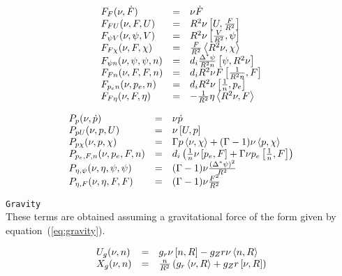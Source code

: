 \begin{equation}
  \begin{array}{lcl}
    F_F (\nu, \dot{F}) & = & \nu \dot{F}\\
    F_{F U}(\nu, F, U) & = & R^2 \nu \left[U,\frac{F}{R^2}\right]\\
    F_{\psi V}(\nu, \psi, V) & = & R^2 \nu \left[\frac{V}{R^2},\psi\right]\\
    F_{F \chi}(\nu, F, \chi) & = & \frac{F}{R^2} \left\langle R^2 \nu,\chi\right\rangle\\
    F_{\psi n}(\nu, \psi, \psi, n) & = &
       d_i \frac{\Delta^* \psi}{R^2 n}\left[\psi,R^2\nu\right]\\
    F_{F n}(\nu, F, F, n) & = &
       d_i R^2 \nu F \left[\frac{1}{R^2 n},F\right]\\
    F_{p_e n}(\nu, p_e, n) & = & d_i R^2 \nu \left[\frac{1}{n},p_e\right]\\
    F_{F \eta}(\nu, F, \eta) & = & -\frac{1}{R^2} \eta \left\langle R^2 \nu,F\right\rangle
  \end{array}
\end{equation}

\begin{equation}
  \begin{array}{lcl}
  P_p(\nu, \dot{p}) & = & \nu \dot{p}
  \\
  P_{p U}(\nu, p, U) & = & \nu \left[U,p\right]
  \\
  P_{p \chi}(\nu, p, \chi) & = & \Gamma p \left\langle \nu,\chi\right\rangle 
    + (\Gamma - 1) \nu \left\langle p,\chi\right\rangle
  \\
  P_{p_e, F, n}(\nu, p_e, F, n) & = & d_i \left( 
      \frac{1}{n} \nu \left[p_e,F\right] 
    + \Gamma \nu p_e \left[\frac{1}{n},F\right] \right)
  \\
  P_{\eta, \psi}(\nu, \eta, \psi, \psi) & = & (\Gamma - 1) \nu
  \frac{(\Delta^* \psi)^2}{R^2}
  \\
  P_{\eta, F}(\nu, \eta, F, F) & = & (\Gamma - 1) \nu \frac{F^2}{R^2}
  \end{array}
\end{equation}

\texttt{Gravity}
\\
These terms are obtained assuming a gravitational force of the form given by
equation~(\ref{eq:gravity}).

\begin{equation}
  \begin{array}{lcl}
    U_g(\nu, n) & = & g_r \nu \left[n,R\right] - g_Z r \nu \left\langle n,R\right\rangle
    \\
    X_g(\nu, n) & = & \frac{n}{R^2} \left( 
    g_r \left\langle \nu,R\right\rangle + g_Z r \left[\nu,R\right] \right)
  \end{array}
\end{equation}




